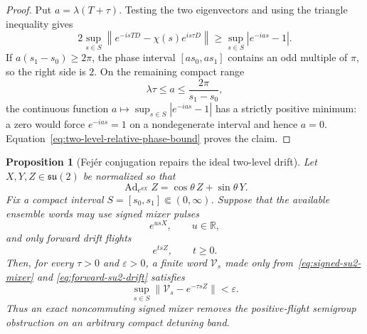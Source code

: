\documentclass[11pt]{article}
\newtheorem{proposition}[theorem]{Proposition}
\theoremstyle{remark}
\begin{document}
\begin{proof}
Put $a=\lambda(T+\tau)$.  Testing the two eigenvectors and using the triangle
inequality gives
\begin{equation}
 2\sup_{s\in S}
 \left\|
  e^{-isTD}-\chi(s)e^{is\tau D}
 \right\|
 \geq
 \sup_{s\in S}|e^{-ias}-1|.
 \label{eq:two-level-relative-phase-bound}
\end{equation}
If $a(s_1-s_0)\geq2\pi$, the phase interval
$[as_0,as_1]$ contains an odd multiple of $\pi$, so the right side is $2$.
On the remaining compact range
\[
 \lambda\tau\leq a\leq\frac{2\pi}{s_1-s_0},
\]
the continuous function
$a\mapsto\sup_{s\in S}|e^{-ias}-1|$ has a strictly positive minimum: a zero
would force $e^{-ias}=1$ on a nondegenerate interval and hence $a=0$.
Equation~\eqref{eq:two-level-relative-phase-bound} proves the claim.
\end{proof}

\begin{proposition}[Fej\'er conjugation repairs the ideal two-level drift]
\label{prop:fejer-su2-inverse}
Let $X,Y,Z\in\mathfrak{su}(2)$ be normalized so that
\begin{equation}
 \operatorname{Ad}_{e^{\theta X}}Z
 =\cos\theta\,Z+\sin\theta\,Y.
 \label{eq:su2-adjoint-rotation}
\end{equation}
Fix a compact interval $S=[s_0,s_1]\Subset(0,\infty)$.  Suppose that the
available ensemble words may use signed mixer pulses
\begin{equation}
 e^{usX},\qquad u\in\mathbb R,
 \label{eq:signed-su2-mixer}
\end{equation}
and only forward drift flights
\begin{equation}
 e^{tsZ},\qquad t\geq0.
 \label{eq:forward-su2-drift}
\end{equation}
Then, for every $\tau>0$ and $\varepsilon>0$, a finite word
$\mathcal V_s$ made only from~\eqref{eq:signed-su2-mixer} and
\eqref{eq:forward-su2-drift} satisfies
\begin{equation}
 \sup_{s\in S}\|\mathcal V_s-e^{-\tau sZ}\|<\varepsilon.
 \label{eq:fejer-uniform-inverse}
\end{equation}
Thus an exact noncommuting signed mixer removes the positive-flight
semigroup obstruction on an arbitrary compact detuning band.
\end{proposition}
\end{document}
